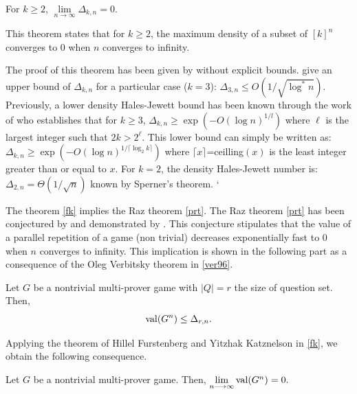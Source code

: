 \begin{thm}	For $k\geq 2$, $\lim\limits_{n\longrightarrow \infty} \Delta_{k,n}=0.$ \label{fk}	\end{thm}
 
This theorem states that for $k\geq 2$, the maximum  density of a subset of $[k]^n$ converges to $0$ when $n$ converges to infinity.

The proof of this theorem has been given by \cite{furstenberg1991density} without explicit bounds. \cite{polymath2012new} give an upper bound of $\Delta_{k,n}$ for a particular case ($k=3$): $\Delta_{3,n} \leq O(1/\sqrt{\log^* n}).$ Previously, a lower  density Hales-Jewett bound  has been known through the work of \cite{polymath2010density} who establishes that  for $k\geq 3$, $\Delta_{k,n} \geq \exp \left(-O(\log n)^{1/l}\right)$ where $\ell$ is the largest integer such that $2k > 2^{\ell}$. This lower bound can simply be written as: $\Delta_{k,n} \geq \exp \left(-O(\log n)^{1/\lceil \log_2 k \rceil}\right)$ where $\lceil x \rceil$=ceilling$(x)$ is the least integer greater than or equal to $x.$ For $k=2$, the density Hales-Jewett number is: $\Delta_{2,n}=\Theta(1/\sqrt{n})$ known by Sperner's theorem.
`

The theorem \eqref{fk} implies the Raz theorem \eqref{prt}.
The Raz theorem \eqref{prt} has been conjectured by \cite{feige1992two} and demonstrated by \cite{raz1998parallel}. This conjecture stipulates that the value of a parallel repetition of a game (non trivial) decreases exponentially  fast to $0$ when $n$ converges to infinity. This implication is shown in the following part as a consequence of the Oleg Verbitsky theorem in  \eqref{ver96}.

\begin{thm}	 Let $G$ be a nontrivial multi-prover game with $|Q|=r$ the size of question set. Then, 
  $$\mathrm{val} (G^n) \leq \Delta_{r,n}.$$	\label{ver96} \end{thm}

Applying the theorem of Hillel Furstenberg and Yitzhak Katznelson in \eqref{fk}, we obtain the following consequence.
\begin{cor}	Let $G$ be a nontrivial multi-prover game. Then, $\lim\limits_{n\longrightarrow \infty} \mathrm{val} (G^n)=0.$ 	\end{cor}

